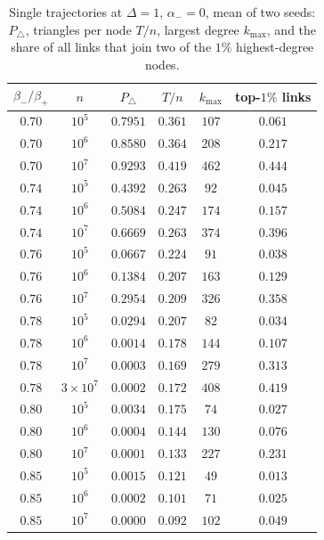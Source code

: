 \documentclass[aps,pre,twocolumn,superscriptaddress,floatfix,nofootinbib]{revtex4-2}
\begin{document}
\begin{table}[t]
\caption{Single trajectories at $\Delta=1$, $\alpha_-=0$, mean of two seeds:
$P_\triangle$, triangles per node $T/n$, largest degree $k_{\max}$, and the
share of all links that join two of the $1\%$ highest-degree nodes.}
\label{tab:traj}
\begin{ruledtabular}
\begin{tabular}{cccccc}
$\beta_-/\beta_+$ & $n$ & $P_\triangle$ & $T/n$ & $k_{\max}$ & top-$1\%$ links\\
\hline
$0.70$ & $10^5$ & $0.7951$ & $0.361$ & $107$ & $0.061$\\
$0.70$ & $10^6$ & $0.8580$ & $0.364$ & $208$ & $0.217$\\
$0.70$ & $10^7$ & $0.9293$ & $0.419$ & $462$ & $0.444$\\
$0.74$ & $10^5$ & $0.4392$ & $0.263$ & $92$ & $0.045$\\
$0.74$ & $10^6$ & $0.5084$ & $0.247$ & $174$ & $0.157$\\
$0.74$ & $10^7$ & $0.6669$ & $0.263$ & $374$ & $0.396$\\
$0.76$ & $10^5$ & $0.0667$ & $0.224$ & $91$ & $0.038$\\
$0.76$ & $10^6$ & $0.1384$ & $0.207$ & $163$ & $0.129$\\
$0.76$ & $10^7$ & $0.2954$ & $0.209$ & $326$ & $0.358$\\
$0.78$ & $10^5$ & $0.0294$ & $0.207$ & $82$ & $0.034$\\
$0.78$ & $10^6$ & $0.0014$ & $0.178$ & $144$ & $0.107$\\
$0.78$ & $10^7$ & $0.0003$ & $0.169$ & $279$ & $0.313$\\
$0.78$ & $3\times10^7$ & $0.0002$ & $0.172$ & $408$ & $0.419$\\
$0.80$ & $10^5$ & $0.0034$ & $0.175$ & $74$ & $0.027$\\
$0.80$ & $10^6$ & $0.0004$ & $0.144$ & $130$ & $0.076$\\
$0.80$ & $10^7$ & $0.0001$ & $0.133$ & $227$ & $0.231$\\
$0.85$ & $10^5$ & $0.0015$ & $0.121$ & $49$ & $0.013$\\
$0.85$ & $10^6$ & $0.0002$ & $0.101$ & $71$ & $0.025$\\
$0.85$ & $10^7$ & $0.0000$ & $0.092$ & $102$ & $0.049$\\
\end{tabular}
\end{ruledtabular}
\end{table}
\end{document}
